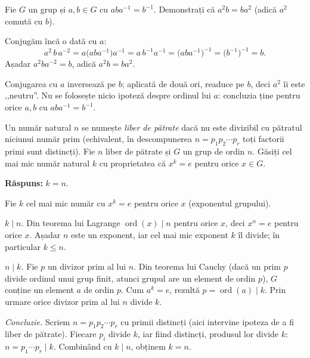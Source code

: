 \begin{problema}
Fie $G$ un grup și $a,b \in G$ cu $aba^{-1}=b^{-1}$. Demonstrați
că $a^{2}b = ba^{2}$ (adică $a^{2}$ comută cu $b$).
\end{problema}

\begin{solutie}
Conjugăm încă o dată cu $a$:
\[
  a^{2}\,b\,a^{-2}
  = a\bigl(aba^{-1}\bigr)a^{-1}
  = a\,b^{-1}a^{-1}
  = \bigl(aba^{-1}\bigr)^{-1}
  = \bigl(b^{-1}\bigr)^{-1}
  = b .
\]
Așadar $a^{2}ba^{-2}=b$, adică $a^{2}b = ba^{2}$.
\end{solutie}

\begin{obs}
Conjugarea cu $a$ inversează pe $b$; aplicată de două ori,
readuce pe $b$, deci $a^{2}$ îi este ,,neutru''. Nu se folosește
nicio ipoteză despre ordinul lui $a$: concluzia ține pentru orice
$a,b$ cu $aba^{-1}=b^{-1}$.
\end{obs}

\begin{problema}
Un număr natural $n$ se numește \emph{liber de pătrate} dacă
nu este divizibil cu pătratul niciunui număr prim (echivalent, în
descompunerea $n=p_{1}p_{2}\cdots p_{r}$ toți factorii primi sunt
distincți). Fie $n$ liber de pătrate și $G$ un grup de ordin
$n$. Găsiți cel mai mic număr natural $k$ cu proprietatea
că $x^{k}=e$ pentru orice $x \in G$.
\end{problema}

\noindent\textbf{Răspuns:} $k=n$.

\begin{solutie}
Fie $k$ cel mai mic număr cu $x^{k}=e$ pentru orice $x$ (exponentul
grupului).

\smallskip
\textit{$k \mid n$.} Din teorema lui Lagrange $\operatorname{ord}(x) \mid n$
pentru orice $x$, deci $x^{n}=e$ pentru orice $x$. Așadar $n$ este un
exponent, iar cel mai mic exponent $k$ îl divide; în particular
$k \le n$.

\smallskip
\textit{$n \mid k$.} Fie $p$ un divizor prim al lui $n$. Din teorema lui
Cauchy (dacă un prim $p$ divide ordinul unui grup finit, atunci grupul
are un element de ordin $p$), $G$ conține un element $a$ de ordin $p$.
Cum $a^{k}=e$, rezultă $p=\operatorname{ord}(a) \mid k$. Prin urmare orice
divizor prim al lui $n$ divide $k$.

\smallskip
\textit{Concluzie.} Scriem $n=p_{1}p_{2}\cdots p_{r}$ cu primii distincți
(aici intervine ipoteza de a fi liber de pătrate). Fiecare $p_{i}$
divide $k$, iar fiind distincți, produsul lor divide $k$:
$n=p_{1}\cdots p_{r} \mid k$. Combinând cu $k \mid n$, obținem
$k=n$.
\end{solutie}


